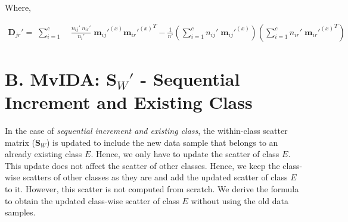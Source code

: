 \noindent
Where,

\begin{equation*}
\begin{split}
\textbf{D}_{jr}' =  \; \sum_{i=1}^{c} & \; \frac{n_{ij}' \; n_{ir}'}{n_{i}'} \; {\textbf{m}_{ij}'}^{(x)} {{\textbf{m}_{ir}'}^{(x)}}^T - \frac{1}{n'} \left (\sum_{i=1}^{c} n_{ij}' \; {\textbf{m}_{ij}'}^{(x)} \right ) \left (\sum_{i=1}^{c} n_{ir}' \; {{\textbf{m}_{ir}'}^{(x)}}^T \right )
\end{split}
\end{equation*}
\normalsize










\section*{B. MvIDA: $\textbf{S}_W'$ - Sequential Increment and Existing Class}
\label{proof:MvIDA_SeqEx}
In the case of \textit{sequential increment and existing class}, the within-class scatter matrix ($\textbf{S}_W$) is updated to include the new data sample that belongs to an already existing class $E$. Hence, we only have to update the scatter of class $E$. This update does not affect the scatter of other classes. Hence, we keep the class-wise scatters of other classes as they are and add the updated scatter of class $E$ to it. However, this scatter is not computed from scratch. We derive the formula to obtain the updated class-wise scatter of class $E$ without using the old data samples.

